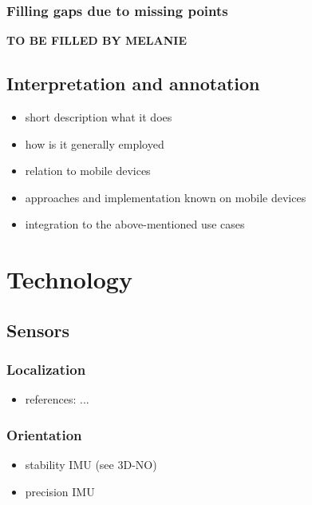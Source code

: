 \documentclass[review]{elsarticle}
\begin{document}
\subsubsection{Filling gaps due to missing points}


\textbf{TO BE FILLED BY MELANIE}

\subsection{Interpretation and annotation}

\begin{itemize}
\item short description what it does
\item how is it generally employed
\item relation to mobile devices
\item approaches and implementation known on mobile devices
\item integration to the above-mentioned use cases
\end{itemize}



\section{Technology}
\label{sec:technology}

\subsection{Sensors}

\subsubsection{Localization}

\begin{itemize}
\item references: ...
\end{itemize}

\subsubsection{Orientation}

\begin{itemize}
\item stability IMU (see 3D-NO)
\item precision IMU
\end{itemize}
\end{document}
